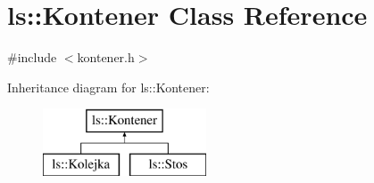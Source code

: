 \hypertarget{classls_1_1_kontener}{\section{ls\-:\-:Kontener Class Reference}
\label{classls_1_1_kontener}
}


{\ttfamily \#include $<$kontener.\-h$>$}

Inheritance diagram for ls\-:\-:Kontener\-:\begin{figure}[H]
\begin{center}
\leavevmode
\includegraphics[height=2.000000cm]{classls_1_1_kontener}
\end{center}
\end{figure}

